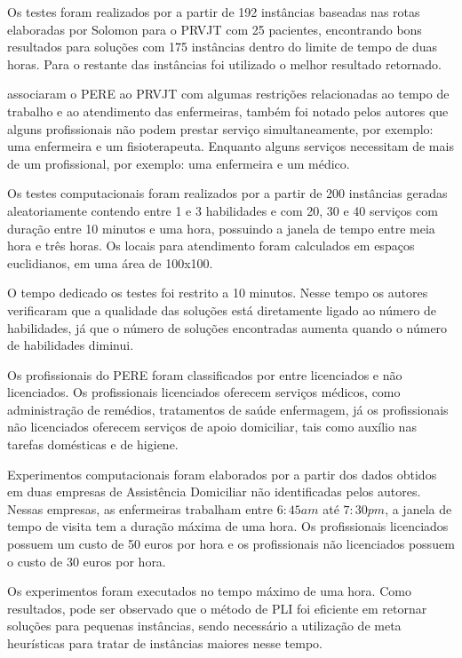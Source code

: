Os testes foram realizados por  a partir de 192 instâncias baseadas nas rotas elaboradas por Solomon para o \ac{PRVJT} com 25 pacientes, encontrando bons resultados para soluções com 175 instâncias dentro do limite de tempo de duas horas. Para o restante das instâncias foi utilizado o melhor resultado retornado.

 associaram o \ac{PERE} ao \ac{PRVJT} com algumas restrições relacionadas ao tempo de trabalho e ao atendimento das enfermeiras, também foi notado pelos autores que alguns profissionais não podem prestar serviço simultaneamente, por exemplo: uma enfermeira e um fisioterapeuta. Enquanto alguns serviços necessitam de mais de um profissional, por exemplo: uma enfermeira e um médico. 

Os testes computacionais foram realizados por  a partir de 200 instâncias geradas aleatoriamente contendo entre 1 e 3 habilidades e com 20, 30 e 40 serviços com duração entre 10 minutos e uma hora, possuindo a janela de tempo entre meia hora e três horas. Os locais para atendimento foram calculados em espaços euclidianos, em uma área de 100x100. 

O tempo dedicado os testes foi restrito a 10 minutos. Nesse tempo os autores verificaram que a qualidade das soluções está diretamente ligado ao número de habilidades, já que o número de soluções encontradas aumenta quando o número de habilidades diminui.

Os profissionais do \ac{PERE} foram classificados por  entre licenciados e não licenciados. Os profissionais licenciados oferecem serviços médicos, como administração de remédios, tratamentos de saúde enfermagem, já os profissionais não licenciados oferecem serviços de apoio domiciliar, tais como auxílio nas tarefas domésticas e de higiene.

Experimentos computacionais foram elaborados por  a partir dos dados obtidos em duas empresas de Assistência Domiciliar não identificadas pelos autores. Nessas empresas, as enfermeiras trabalham entre $6:45 am$ até $7:30 pm$, a janela de tempo de visita tem a duração máxima de uma hora. Os profissionais licenciados possuem um custo de 50 euros por hora e os profissionais não licenciados possuem o custo de 30 euros por hora.

Os experimentos foram executados no tempo máximo de uma hora. Como resultados, pode ser observado que o método de \ac{PLI} foi eficiente em retornar soluções para pequenas instâncias, sendo necessário a utilização de meta heurísticas para tratar de instâncias maiores nesse tempo.

